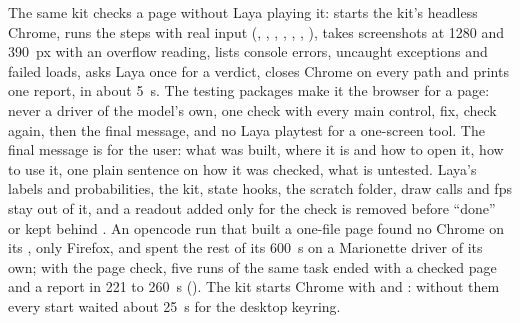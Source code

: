 The same kit checks a page without Laya playing it:  starts the kit's headless Chrome, runs the steps with real input (, , , , , , ), takes screenshots at 1280 and 390~px with an overflow reading, lists console errors, uncaught exceptions and failed loads, asks Laya once for a verdict, closes Chrome on every path and prints one report, in about 5~s. The testing packages make it the browser for a page: never a driver of the model's own, one check with every main control, fix, check again, then the final message, and no Laya playtest for a one-screen tool. The final message is for the user: what was built, where it is and how to open it, how to use it, one plain sentence on how it was checked, what is untested. Laya's labels and probabilities, the kit, state hooks, the scratch folder, draw calls and fps stay out of it, and a readout added only for the check is removed before \enquote{done} or kept behind . An opencode run that built a one-file page found no Chrome on its , only Firefox, and spent the rest of its 600~s on a Marionette driver of its own; with the page check, five runs of the same task ended with a checked page and a report in 221 to 260~s (\measured). The kit starts Chrome with  and : without them every start waited about 25~s for the desktop keyring.
